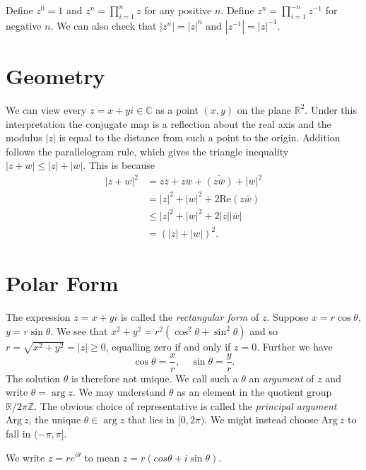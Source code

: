 Define $z^0 = 1$ and $z^n = \prod_{i=1}^n z$ for any positive $n$.
Define $z^n = \prod_{i=1}^{-n} z^{-1}$ for negative $n$. We can also
check that $|z^n| = |z|^n$ and $|z^{-1}| = |z|^{-1}$.

\section{Geometry}
We can view every $z = x + yi \in \mathbb{C}$ as a point $(x,y)$ on the plane
$\mathbb{R}^2$. Under this interpretation the conjugate map is a reflection
about the real axis and the modulus $|z|$ is equal to the distance from such a
point to the origin. Addition follows the parallelogram rule, which gives the
triangle inequality $|z + w| \leq |z| + |w|$. This is because
\begin{align*}
      |z + w|^2
&=    z \bar{z} + z\bar{w} + \bar{(z\bar{w})} + |w|^2 \\
&=    |z|^2 + |w|^2 + 2 \mathrm{Re}(z\bar{w}) \\
&\leq |z|^2 + |w|^2 + 2|z||\bar{w}| \\
&=    (|z| + |w|)^2.
\end{align*}

\section{Polar Form}

The expression $z = x + yi$ is called the \emph{rectangular form}
of $z$. Suppose $x = r \cos \theta$, $y = r \sin \theta$. We see that
$x^2 + y^2 = r^2 (\cos^2 \theta + \sin^2 \theta)$ and so
$r = \sqrt{x^2 + y^2} = |z| \geq 0$, equalling zero if and only if $z = 0$.
Further we have
$$
\cos \theta = \frac{x}{r}, \quad
\sin \theta = \frac{y}{r}.
$$
The solution $\theta$ is therefore not unique. We call such a $\theta$ an
\emph{argument} of $z$ and write $\theta = \arg z$. We may understand
$\theta$ as an element in the quotient group $\mathbb{R} / 2 \pi \mathbb{Z}$.
The obvious choice of representative is called the \emph{principal argument}
$\mathrm{Arg}~z$, the unique $\theta \in \arg z$ that lies in $[0, 2\pi)$.
We might instead choose $\mathrm{Arg}~z$ to fall in $(-\pi, \pi]$.

We write $z = r e^{i\theta}$ to mean $z = r (cos \theta + i \sin \theta)$.
